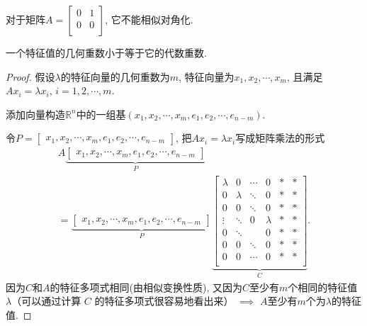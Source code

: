 \begin{example}
    对于矩阵$A = \begin{bmatrix}
     0 & 1\\
     0 & 0\\
    \end{bmatrix}$, 它不能相似对角化. 
\end{example}

\begin{theorem}
    一个特征值的几何重数小于等于它的代数重数.
\end{theorem}

\begin{proof}
    假设$\lambda$的特征向量的几何重数为$m$, 特征向量为$x_1,x_2,\cdots,x_m$, 且满足$A x_i = \lambda x_i$, $i = 1, 2, \cdots, m$.

    添加向量构造$\mathbb{R}^{n}$中的一组基$\left( x_1,x_2,\cdots,x_m, e_1,e_2,\cdots,e_{n-m} \right) $. 
    
    令$P = \begin{bmatrix} x_1,x_2,\cdots,x_m, e_1,e_2,\cdots,e_{n-m} \end{bmatrix}$, 把$Ax_i = \lambda x_i $写成矩阵乘法的形式
    \begin{equation}
        \begin{gathered}
            A \underbrace{\begin{bmatrix} x_1,x_2,\cdots,x_m, e_1,e_2,\cdots,e_{n-m} \end{bmatrix}}_{P} 
            \\
            =
            \underbrace{\begin{bmatrix} x_1,x_2,\cdots,x_m, e_1,e_2,\cdots,e_{n-m} \end{bmatrix}}_{P} 
            \underbrace{\left[ 
                \begin{array}{cccc|cc}
                    \lambda &0 & \cdots& 0&* &* \\
                    0& \lambda &\ddots & 0&* &* \\
                    0& 0& \ddots & 0&* &* \\
                    \vdots& \ddots&  0& \lambda &* &* \\
                    \hline
                    0& \ddots& &0 &*  &* \\
                    0& 0& \ddots & 0& *& * \\
                    0& 0&\cdots &0& *& * \\
                    \end{array}
             \right] 
            }_{C}.
        \end{gathered}
    \end{equation}
    因为$C$和$A$的特征多项式相同(由相似变换性质), 又因为$C$至少有$m$个相同的特征值 $\lambda$（可以通过计算 $C $ 的特征多项式很容易地看出来） $\implies$ $A$至少有$m$个为$\lambda$的特征值.
\end{proof}

